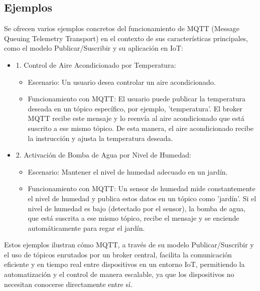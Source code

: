 \documentclass{report}
\begin{document}
\subsection{Ejemplos}
Se ofrecen varios ejemplos concretos del funcionamiento de MQTT (Message Queuing Telemetry Transport) 
en el contexto de sus características principales, como el modelo Publicar/Suscribir y su aplicación en IoT:
\begin{itemize}
    \item 1. Control de Aire Acondicionado por Temperatura:
        \begin{itemize}
            \item Escenario: Un usuario desea controlar un aire acondicionado.
            \item Funcionamiento con MQTT: El usuario puede publicar la temperatura deseada en un tópico específico, por ejemplo, 'temperatura'. 
            El broker MQTT recibe este mensaje y lo reenvía al aire acondicionado que está suscrito a ese mismo tópico. De esta manera, el aire 
            acondicionado recibe la instrucción y ajusta la temperatura deseada.
        \end{itemize}
    \item 2. Activación de Bomba de Agua por Nivel de Humedad:
        \begin{itemize}
            \item Escenario: Mantener el nivel de humedad adecuado en un jardín.
            \item Funcionamiento con MQTT: Un sensor de humedad mide constantemente el nivel de humedad y publica estos datos en un tópico 
            como 'jardín'. Si el nivel de humedad es bajo (detectado por el sensor), la bomba de agua, que está suscrita a ese mismo tópico, 
            recibe el mensaje y se enciende automáticamente para regar el jardín.
        \end{itemize}
\end{itemize}
Estos ejemplos ilustran cómo MQTT, a través de su modelo Publicar/Suscribir y el uso de tópicos enrutados por un broker central, 
facilita la comunicación eficiente y en tiempo real entre dispositivos en un entorno IoT, permitiendo la automatización y el 
control de manera escalable, ya que los dispositivos no necesitan conocerse directamente entre sí.
\end{document}
